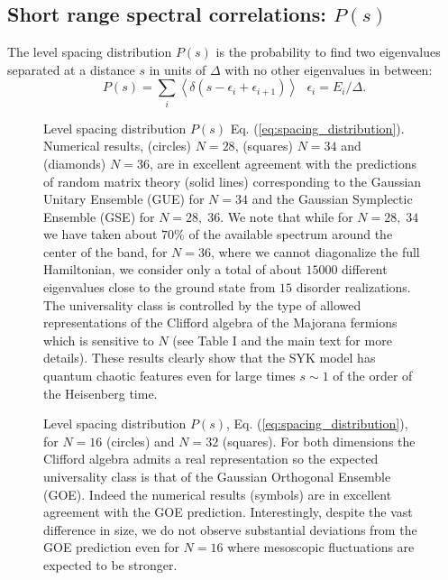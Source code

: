 \documentclass[aps,showpacs,floatfix,superscriptaddress,pre,11pt]{revtex4-1}
\begin{document}
\subsection{Short range spectral correlations: $P(s)$} 
The level spacing distribution $P(s)$ is the probability to find two eigenvalues separated at a distance $s$ in units of $\Delta$ with no other eigenvalues in between:
\begin{equation}
P(s) = \sum_i \left\langle \delta(s-\epsilon_i+\epsilon_{i+1})\right\rangle \ \ \  \epsilon_i = E_i/\Delta.
\label{eq:spacing_distribution}
\end{equation}
\begin{figure}%
	\centering
	\caption{Level spacing distribution $P(s)$ Eq. (\ref{eq:spacing_distribution}). Numerical results, (circles) $N = 28$, (squares) $N = 34$ and (diamonds) $N = 36$, are in excellent agreement with the predictions of random matrix theory (solid lines) corresponding to the Gaussian Unitary Ensemble (GUE) for $N = 34$ and the Gaussian Symplectic Ensemble (GSE) for $N = 28,\; 36$. We note that while for $N = 28,\; 34$ we have taken about $70\%$ of the available spectrum around the center of the band, for $N = 36$, where we cannot diagonalize the full Hamiltonian, we consider only a total of about $15000$ different eigenvalues close to the ground state from $15$ disorder realizations. The universality class is controlled by the type of allowed representations of the Clifford algebra of the Majorana fermions which is sensitive to $N$ (see Table I and the main text for more details). These results clearly show that the SYK model has quantum chaotic features even for large times $s \sim 1$ of the order of the Heisenberg time.}
	\label{fig4a}
\end{figure}
\begin{figure}[b]%
	\centering
	\caption{Level spacing distribution $P(s)$, Eq. (\ref{eq:spacing_distribution}), for $N = 16$ (circles)  and $N = 32$ (squares). For both dimensions the Clifford algebra admits a real representation so the expected universality class is that of the Gaussian Orthogonal Ensemble (GOE). Indeed  the numerical results (symbols) are in excellent agreement with the GOE prediction. Interestingly, despite the vast difference in size, we do not observe substantial deviations from the GOE prediction even for $N = 16$ where mesoscopic fluctuations are expected to be stronger.}
	\label{fig5}
\end{figure}
\end{document}
